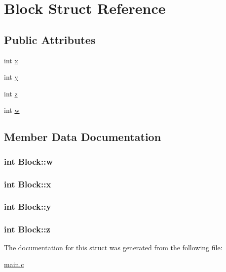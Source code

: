 \hypertarget{structBlock}{}\section{Block Struct Reference}
\label{structBlock}
\subsection*{Public Attributes}
\begin{DoxyCompactItemize}
\item 
int \hyperlink{structBlock_a13d0a6d225233353862fa5adcbadf661}{x}
\item 
int \hyperlink{structBlock_a9328d6b6fcc9f9c019d091d87ceda41c}{y}
\item 
int \hyperlink{structBlock_aeb6a2ee081d32a7c2e8f3ddcca235fc9}{z}
\item 
int \hyperlink{structBlock_aea0530a4c08ea5892151575b5301940e}{w}
\end{DoxyCompactItemize}


\subsection{Member Data Documentation}
\subsubsection[{\texorpdfstring{w}{w}}]{\setlength{\rightskip}{0pt plus 5cm}int Block\+::w}\hypertarget{structBlock_aea0530a4c08ea5892151575b5301940e}{}\label{structBlock_aea0530a4c08ea5892151575b5301940e}
\subsubsection[{\texorpdfstring{x}{x}}]{\setlength{\rightskip}{0pt plus 5cm}int Block\+::x}\hypertarget{structBlock_a13d0a6d225233353862fa5adcbadf661}{}\label{structBlock_a13d0a6d225233353862fa5adcbadf661}
\subsubsection[{\texorpdfstring{y}{y}}]{\setlength{\rightskip}{0pt plus 5cm}int Block\+::y}\hypertarget{structBlock_a9328d6b6fcc9f9c019d091d87ceda41c}{}\label{structBlock_a9328d6b6fcc9f9c019d091d87ceda41c}
\subsubsection[{\texorpdfstring{z}{z}}]{\setlength{\rightskip}{0pt plus 5cm}int Block\+::z}\hypertarget{structBlock_aeb6a2ee081d32a7c2e8f3ddcca235fc9}{}\label{structBlock_aeb6a2ee081d32a7c2e8f3ddcca235fc9}


The documentation for this struct was generated from the following file\+:\begin{DoxyCompactItemize}
\item 
\hyperlink{main_8c}{main.\+c}\end{DoxyCompactItemize}
